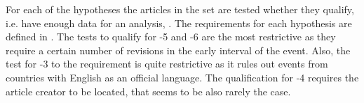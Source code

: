 


For each of the hypotheses the articles in the set are tested whether they qualify, i.e. have enough data for an analysis, . 
The requirements for each hypothesis are defined in .
The tests to qualify for \hyp{5} and \hyp{6} are the most restrictive as they require a certain number of revisions in the early interval of the event.
Also, the test for \hyp{3} to the requirement is quite restrictive as it rules out events from countries with English as an official language.
The qualification for \hyp{4} requires the article creator to be located, that seems to be also rarely the case.

